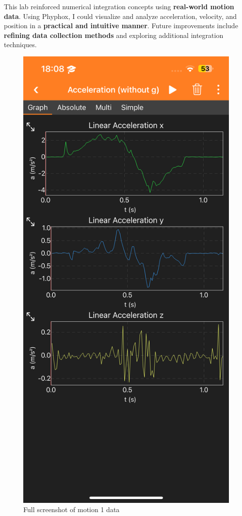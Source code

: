 \documentclass[idxtotoc,hyperref,openany]{labbook} %
\begin{document}

This lab reinforced numerical integration concepts using \textbf{real-world motion data}. Using Phyphox, I could visualize and analyze acceleration, velocity, and position in a \textbf{practical and intuitive manner}. Future improvements include \textbf{refining data collection methods} and exploring additional integration techniques.


\newpage
{}
\begin{figure}[H] %
\begin{center}
\includegraphics[width=.55\linewidth]{images/Lab.03/Lab03Motion1.PNG}
\end{center}
\caption{Full screenshot of motion 1 data}
\label{fig:Lab03-Motion1}
\end{figure}
\end{document}
